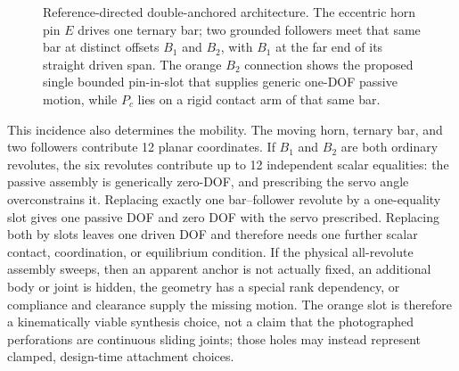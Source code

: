 \documentclass[11pt]{article}
\begin{document}
\begin{figure}[H]
  \caption{Reference-directed double-anchored architecture. The eccentric horn
  pin $E$ drives one ternary bar; two grounded followers meet that same bar at
  distinct offsets $B_1$ and $B_2$, with $B_1$ at the far end of its straight
  driven span. The orange $B_2$ connection shows the proposed single bounded
  pin-in-slot that supplies generic one-DOF passive motion, while $P_c$ lies on
  a rigid contact arm of that same bar.}
  \label{fig:digit-synthesis}
\end{figure}

This incidence also determines the mobility. The moving horn, ternary bar, and
two followers contribute 12 planar coordinates. If $B_1$ and $B_2$ are both
ordinary revolutes, the six revolutes contribute up to 12 independent scalar
equalities: the passive assembly is generically zero-DOF, and prescribing the
servo angle overconstrains it. Replacing exactly one bar--follower revolute by
a one-equality slot gives one passive DOF and zero DOF with the servo
prescribed. Replacing both by slots leaves one driven DOF and therefore needs
one further scalar contact, coordination, or equilibrium condition. If the
physical all-revolute assembly sweeps, then an apparent anchor is not actually
fixed, an additional body or joint is hidden, the geometry has a special rank
dependency, or compliance and clearance supply the missing motion.
The orange slot is therefore a kinematically viable synthesis choice, not a
claim that the photographed perforations are continuous sliding joints; those
holes may instead represent clamped, design-time attachment choices.
\end{document}
